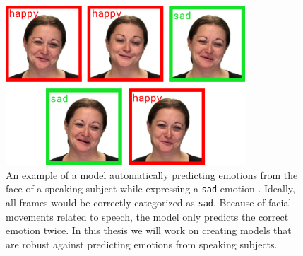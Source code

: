 \begin{figure}
    \centering
    \includegraphics[width=0.8\textwidth]{res/ravdess_mistake.pdf}
    \caption{An example of a model automatically predicting emotions from the face of a speaking subject while expressing a \texttt{sad} emotion \cite{livingstone2018ryerson}. Ideally, all frames would be correctly categorized as \texttt{sad}. Because of facial movements related to speech, the model only predicts the correct emotion twice. In this thesis we will work on creating models that are robust against predicting emotions from speaking subjects.}
    \label{fig:mislabel}
\end{figure}